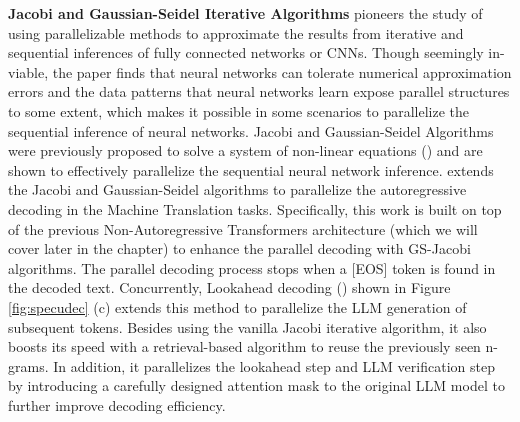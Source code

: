 \textbf{Jacobi and Gaussian-Seidel Iterative Algorithms} \cite{pmlr-v139-song21a} pioneers the study of using parallelizable methods to approximate the results from iterative and sequential inferences of fully connected networks or CNNs. Though seemingly in-viable, the paper finds that neural networks can tolerate numerical approximation errors and the data patterns that neural networks learn expose parallel structures to some extent, which makes it possible in some scenarios to parallelize the sequential inference of neural networks. 
Jacobi and Gaussian-Seidel Algorithms were previously proposed to solve a system of non-linear equations (\cite{ortega2000iterative}) and are shown to effectively parallelize the sequential neural network inference. \cite{santilli2023accelerating} extends the Jacobi and Gaussian-Seidel algorithms to parallelize the autoregressive decoding in the Machine Translation tasks. Specifically, this work is built on top of the previous Non-Autoregressive Transformers architecture (which we will cover later in the chapter) to enhance the parallel decoding with GS-Jacobi algorithms. The parallel decoding process stops when a [EOS] token is found in the decoded text. Concurrently, Lookahead decoding (\cite{fu2023lookahead}) shown in Figure \ref{fig:specudec} (c) extends this method to parallelize the LLM generation of subsequent tokens. Besides using the vanilla Jacobi iterative algorithm, it also boosts its speed with a retrieval-based algorithm to reuse the previously seen n-grams. In addition, it parallelizes the lookahead step and LLM verification step by introducing a carefully designed attention mask to the original LLM model to further improve decoding efficiency. 

